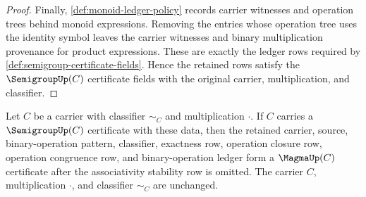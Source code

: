 \begin{proof}
Finally, \autoref{def:monoid-ledger-policy} records carrier witnesses and operation trees behind monoid expressions. Removing the entries whose operation tree uses the identity symbol leaves the carrier witnesses and binary multiplication provenance for product expressions. These are exactly the ledger rows required by \autoref{def:semigroup-certificate-fields}. Hence the retained rows satisfy the $\SemigroupUp(C)$ certificate fields with the original carrier, multiplication, and classifier.
\end{proof}

\begin{proposition}
\label{prop:semigroup-forgets-magma-certificate}
Let $C$ be a carrier with classifier $\sim_C$ and multiplication $\cdot$. If
$C$ carries a $\SemigroupUp(C)$ certificate with these data, then the retained
carrier, source, binary-operation pattern, classifier, exactness row, operation
closure row, operation congruence row, and binary-operation ledger form a
$\MagmaUp(C)$ certificate after the associativity stability row is omitted. The
carrier $C$, multiplication $\cdot$, and classifier $\sim_C$ are unchanged.
\end{proposition}
